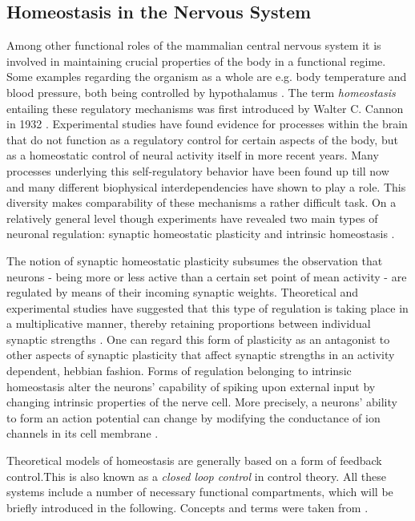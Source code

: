 \documentclass[10pt,a4paper]{article}
\begin{document}
\subsection{Homeostasis in the Nervous System}
Among other functional roles of the mammalian central nervous system it is involved in maintaining crucial properties of the body in a functional regime. Some examples regarding the organism as a whole are e.g. body temperature and blood pressure, both being controlled by hypothalamus \cite[p. 484]{Bear_Exploring_the_Brain}. The term \textit{homeostasis} entailing these regulatory mechanisms was first introduced by Walter C. Cannon in 1932 \cite{Wisdom_of_the_Body_Cannon, Homeostasis_Queenan_2012}. Experimental studies have found evidence for processes within the brain that do not function as a regulatory control for certain aspects of the body, but as a homeostatic control of neural activity itself \cite{Turrigiano_1994,Burrone_2003}in more recent years. Many processes underlying this self-regulatory behavior have been found up till now and many different biophysical interdependencies have shown to play a role. This diversity makes comparability of these mechanisms a rather difficult task. On a relatively general level though experiments have revealed two main types of neuronal regulation: synaptic homeostatic plasticity and intrinsic homeostasis \cite{Desai_2003}. 

The notion of synaptic homeostatic plasticity subsumes the observation that neurons - being more or less active than a certain set point of mean activity - are regulated by means of their incoming synaptic weights. Theoretical and experimental studies have suggested that this type of regulation is taking place in a multiplicative manner, thereby retaining proportions between individual synaptic strengths \cite{Syn_Plast_Abbott}. One can regard this form of plasticity as an antagonist to other aspects of synaptic plasticity that affect synaptic strengths in an activity dependent, hebbian fashion. Forms of regulation belonging to intrinsic homeostasis alter the neurons' capability of spiking upon external input by changing intrinsic properties of the nerve cell. More precisely, a neurons' ability to form an action potential can change by modifying the conductance of ion channels in its cell membrane \cite[p. 156]{Theor_Neur_Dayan}.

Theoretical models of homeostasis are generally based on a form of feedback control.This is also known as a \textit{closed loop control} in control theory. All these systems include a number of necessary functional compartments, which will be briefly introduced in the following. Concepts and terms were taken from \cite[p. 59-64]{Cybernetik_Systems_Cruse_2006}.
\newpage
\end{document}
